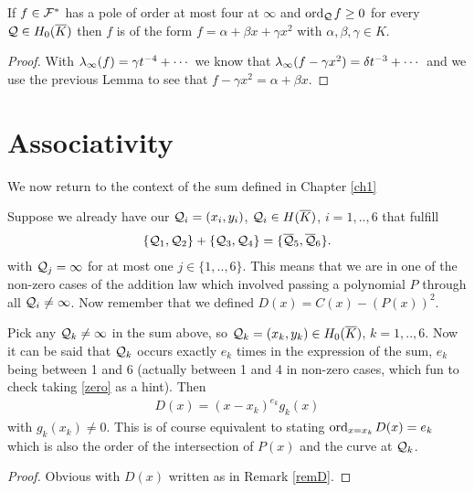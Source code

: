 \documentclass[english,11pt,a4paper]{article}
\begin{document}
\begin{lemma}\label{fourpoles}
  If $f \in \mathcal{F}^*$ has a pole of order at most four at $\infty$ and $\text{ord}_{\mathcal{Q}}\hspace{0.4mm} f \geq 0$ for every $\mathcal{Q} \in H_0(\overline K)$ then $f$ is of the form $f = \alpha + \beta x + \gamma x^2$ with $\alpha, \beta, \gamma \in K$.
  \begin{proof}
    With $\lambda_{\infty} (f) = \gamma t^{-4} + \cdots$ we know that $\lambda_{\infty} (f - \gamma x^2) = \delta t^{-3} + \cdots$ and we use the previous Lemma to see that $f - \gamma x^2 = \alpha + \beta x$.
  \end{proof}
\end{lemma}

\newpage

\section{Associativity}

We now return to the context of the sum defined in Chapter \ref{ch1}

Suppose we already have our $\mathcal{Q}_i = (x_i, y_i)$, $\mathcal{Q}_i \in H(\overline K)$, $i=1,..,6$ that fulfill
\begin{align*}
  \{ \mathcal{Q}_1 , \mathcal{Q}_2\}+\{\mathcal{Q}_3 , \mathcal{Q}_4\} = \{\overline {\mathcal{Q}}_5 , \overline {\mathcal{Q}}_6 \}.
\end{align*}
with $\mathcal{Q}_j = \infty$ for at most one $j \in \{1,..,6\}$. This means that we are in one of the non-zero cases of the addition law which involved passing a polynomial $P$ through all $\mathcal{Q}_i \neq \infty$. Now remember that we defined $D(x) = C(x) - (P(x))^2$.
\begin{lemma}\label{mult}
  Pick any $\mathcal{Q}_k \neq \infty$ in the sum above, so $\mathcal{Q}_k = (x_k, y_k) \in H_0(\overline K)$, $k = 1,..,6$. Now it can be said that $\mathcal{Q}_k$ occurs exactly $e_k$ times in the expression of the sum, $e_k$ being between 1 and 6 (actually between 1 and 4 in non-zero cases, which fun to check taking \eqref{zero} as a hint). Then
  \begin{align*}
    D(x) = (x-x_k)^{e_k} g_k(x)
  \end{align*}
  with $g_k(x_k) \neq 0$. This is of course equivalent to stating $\text{ord}_{x=x_k}\hspace{0.4mm} D(x) = e_k$ which is also the order of the intersection of $P(x)$ and the curve at $\mathcal{Q}_k$.%
  \begin{proof} Obvious with $D(x)$ written as in Remark \ref{remD}.
  \end{proof}
\end{lemma}
\end{document}
